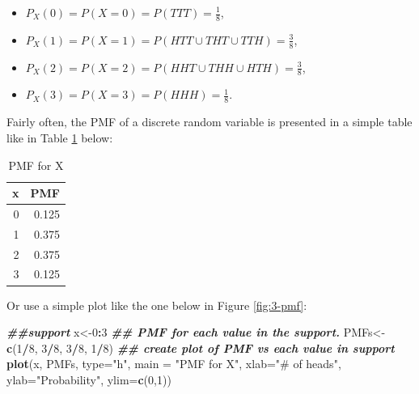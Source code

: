 \documentclass[
]{book}
\newenvironment{Shaded}{\begin{snugshade}}{\end{snugshade}}
\newcommand{\AttributeTok}[1]{\textcolor[rgb]{0.13,0.29,0.53}{#1}}
\newcommand{\DecValTok}[1]{\textcolor[rgb]{0.00,0.00,0.81}{#1}}
\newcommand{\DocumentationTok}[1]{\textcolor[rgb]{0.56,0.35,0.01}{\textbf{\textit{#1}}}}
\newcommand{\FunctionTok}[1]{\textcolor[rgb]{0.13,0.29,0.53}{\textbf{#1}}}
\newcommand{\NormalTok}[1]{#1}
\newcommand{\OtherTok}[1]{\textcolor[rgb]{0.56,0.35,0.01}{#1}}
\newcommand{\SpecialCharTok}[1]{\textcolor[rgb]{0.81,0.36,0.00}{\textbf{#1}}}
\newcommand{\StringTok}[1]{\textcolor[rgb]{0.31,0.60,0.02}{#1}}
\providecommand{\tightlist}{%
  \setlength{\itemsep}{0pt}\setlength{\parskip}{0pt}}
\begin{document}
\begin{itemize}
\tightlist
\item
  \(P_X(0) = P(X=0) = P(TTT) = \frac{1}{8}\),
\item
  \(P_X(1) = P(X=1) = P(HTT \cup THT \cup TTH) = \frac{3}{8}\),
\item
  \(P_X(2) = P(X=2) = P(HHT \cup THH \cup HTH) = \frac{3}{8}\),
\item
  \(P_X(3) = P(X=3) = P(HHH) = \frac{1}{8}\).
\end{itemize}

Fairly often, the PMF of a discrete random variable is presented in a simple table like in Table \ref{tab:3-pmf-tab} below:

\begin{table}

\caption{\label{tab:3-pmf-tab}PMF for X}
\centering
\begin{tabular}[t]{r|r}
\hline
x & PMF\\
\hline
0 & 0.125\\
\hline
1 & 0.375\\
\hline
2 & 0.375\\
\hline
3 & 0.125\\
\hline
\end{tabular}
\end{table}

Or use a simple plot like the one below in Figure \ref{fig:3-pmf}:

\begin{Shaded}
\begin{Highlighting}[]
\DocumentationTok{\#\#support}
\NormalTok{x}\OtherTok{\textless{}{-}}\DecValTok{0}\SpecialCharTok{:}\DecValTok{3}
\DocumentationTok{\#\# PMF for each value in the support. }
\NormalTok{PMFs}\OtherTok{\textless{}{-}}\FunctionTok{c}\NormalTok{(}\DecValTok{1}\SpecialCharTok{/}\DecValTok{8}\NormalTok{, }\DecValTok{3}\SpecialCharTok{/}\DecValTok{8}\NormalTok{, }\DecValTok{3}\SpecialCharTok{/}\DecValTok{8}\NormalTok{, }\DecValTok{1}\SpecialCharTok{/}\DecValTok{8}\NormalTok{)}
\DocumentationTok{\#\# create plot of PMF vs each value in support}
\FunctionTok{plot}\NormalTok{(x, PMFs, }\AttributeTok{type=}\StringTok{"h"}\NormalTok{, }\AttributeTok{main =} \StringTok{"PMF for X"}\NormalTok{, }\AttributeTok{xlab=}\StringTok{"\# of heads"}\NormalTok{, }\AttributeTok{ylab=}\StringTok{"Probability"}\NormalTok{, }\AttributeTok{ylim=}\FunctionTok{c}\NormalTok{(}\DecValTok{0}\NormalTok{,}\DecValTok{1}\NormalTok{))}
\end{Highlighting}
\end{Shaded}
\end{document}
